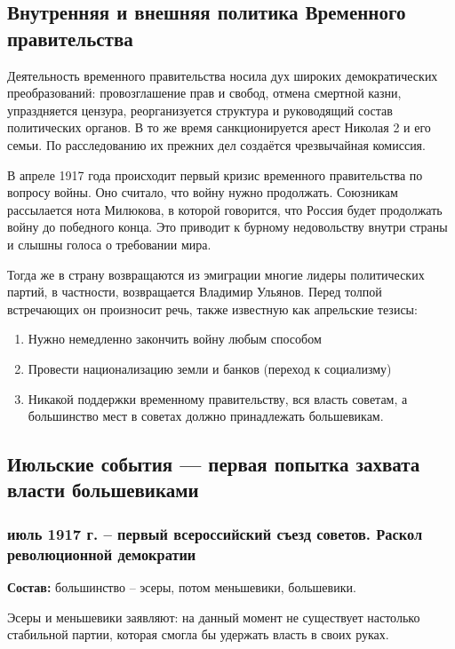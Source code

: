 \subsection{Внутренняя и внешняя политика Временного правительства}

Деятельность временного правительства носила дух широких демократических преобразований: провозглашение прав и свобод, отмена смертной казни, упраздняется цензура, реорганизуется структура и руководящий состав политических органов. В то же время санкционируется арест Николая 2 и его семьи. По расследованию их прежних дел создаётся чрезвычайная комиссия.

В апреле 1917 года происходит первый кризис временного правительства по вопросу войны. Оно считало, что войну нужно продолжать. Союзникам рассылается нота Милюкова, в которой говорится, что Россия будет продолжать войну до победного конца. Это приводит к бурному недовольству внутри страны и слышны голоса о требовании мира.
 
Тогда же в страну возвращаются из эмиграции многие лидеры политических партий, в частности, возвращается Владимир Ульянов. Перед толпой встречающих он произносит речь, также известную как апрельские тезисы:

\begin{enumerate}
    \item Нужно немедленно закончить войну любым способом
    \item Провести национализацию земли и банков (переход к социализму)
    \item Никакой поддержки временному правительству, вся власть советам, а большинство мест в советах должно принадлежать большевикам.
\end{enumerate}

\subsection{Июльские события — первая попытка захвата власти большевиками}

\subsubsection{июль 1917 г. – первый всероссийский съезд советов. Раскол революционной демократии}

\textbf{Состав:} большинство – эсеры, потом меньшевики, большевики.

Эсеры и меньшевики заявляют: на данный момент не существует настолько стабильной партии, которая смогла бы удержать власть в своих руках.


